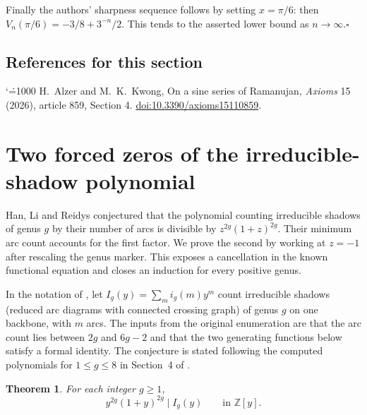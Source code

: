 \documentclass[11pt,a4paper]{article}
\makeatletter
\numberwithin{equation}{section}
\newtheorem{theorem}{Theorem}[section]
\theoremstyle{definition}
\theoremstyle{remark}
\newenvironment{sectionabstract}{\par\smallskip\begingroup\small\noindent}{\par\endgroup\medskip}
\renewenvironment{thebibliography}[1]
 {\subsection*{References for this section}\small
  \list{\@biblabel{\@arabic\c@enumiv}}
       {\settowidth\labelwidth{\@biblabel{#1}}\leftmargin\labelwidth
        \advance\leftmargin\labelsep\@openbib@code
        \usecounter{enumiv}\let\p@enumiv\@empty
        \renewcommand\theenumiv{\@arabic\c@enumiv}}
  \sloppy\clubpenalty4000\widowpenalty4000\sfcode`\.=1000\relax}
 {\def\@noitemerr{\@latex@warning{Empty bibliography}}\endlist}
\makeatother
\begin{document}
Finally the authors' sharpness sequence \cite[Remark 1]{r44keio:ak} follows by setting $x=\pi/6$: then $V_n(\pi/6)=-3/8+3^{-n}/2$. This tends to the asserted lower bound as $n\to\infty$.\hfill$\square$

\begin{thebibliography}{1}
 H.~Alzer and M.~K.~Kwong, On a sine series of Ramanujan, \emph{Axioms} 15 (2026), article 859, Section 4. \href{https://doi.org/10.3390/axioms15110859}{doi:10.3390/axioms15110859}.
\end{thebibliography}

\par\endgroup

\begingroup

\section{\texorpdfstring{Two forced zeros of the irreducible-shadow polynomial}{Two forced zeros of the irreducible-shadow polynomial}}\label{section:r45taisho}
\par\medskip


\begin{sectionabstract}
Han, Li and Reidys conjectured that the polynomial counting
irreducible shadows of genus $g$ by their number of arcs is divisible
by $z^{2g}(1+z)^{2g}$. Their minimum arc count accounts for the
first factor. We prove the second by working at $z=-1$ after rescaling
the genus marker. This exposes a cancellation in the known functional
equation and closes an induction for every positive genus.
\end{sectionabstract}
In the notation of \cite{r45taisho:HLR}, let $I_g(y)=\sum_m i_g(m)y^m$ count
irreducible shadows (reduced arc diagrams with connected crossing
graph) of genus $g$ on one backbone, with $m$ arcs. The inputs from
the original enumeration are that the arc count lies between $2g$
and $6g-2$ and that the two generating functions below satisfy
a formal identity. The conjecture is stated following the computed
polynomials for $1\le g\le8$ in Section~4 of \cite{r45taisho:HLR}.
\begin{theorem}
For each integer $g\ge1$,
\[
 y^{2g}(1+y)^{2g}\mid I_g(y)\qquad\text{in }\mathbb Z[y].
\]
\end{theorem}
\end{document}
